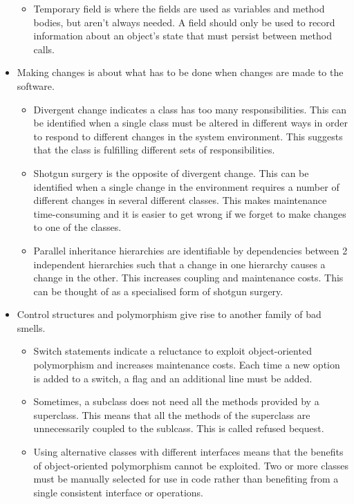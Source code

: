 \documentclass[a4paper, openany]{memoir}
\begin{document}
\begin{itemize}
\begin{itemize}
        \item Temporary field is where the fields are used as variables and method bodies, but aren't always needed. A field should only be used to record information about an object's state that must persist between method calls.
    \end{itemize}
    \item Making changes is about what has to be done when changes are made to the software.
    \begin{itemize}
        \item Divergent change indicates a class has too many responsibilities. This can be identified when a single class must be altered in different ways in order to respond to different changes in the system environment. This suggests that the class is fulfilling different sets of responsibilities.
        \item Shotgun surgery is the opposite of divergent change. This can be identified when a single change in the environment requires a number of different changes in several different classes. This makes maintenance time-consuming and it is easier to get wrong if we forget to make changes to one of the classes.
        \item Parallel inheritance hierarchies are identifiable by dependencies between 2 independent hierarchies such that a change in one hierarchy causes a change in the other. This increases coupling and maintenance costs. This can be thought of as a specialised form of shotgun surgery.
    \end{itemize}
    
    \item Control structures and polymorphism give rise to another family of bad smells.
    \begin{itemize}
        \item Switch statements indicate a reluctance to exploit object-oriented polymorphism and increases maintenance costs. Each time a new option is added to a switch, a flag and an additional line must be added.
        \item Sometimes, a subclass does not need all the methods provided by a superclass. This means that all the methods of the superclass are unnecessarily coupled to the sublcass. This is called refused bequest.
        \item Using alternative classes with different interfaces means that the benefits of object-oriented polymorphism cannot be exploited. Two or more classes must be manually selected for use in code rather than benefiting from a single consistent interface or operations.
    \end{itemize}
    

\end{itemize}
\end{document}
